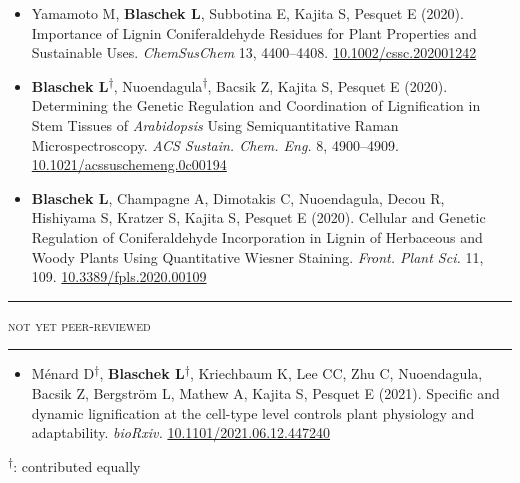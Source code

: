 \documentclass[11pt]{article}
\newcommand*{\xdash}[1][3em]{\rule[0.5ex]{#1}{0.55pt}}
\begin{document}
\vspace{-0.175cm}	
\begin{itemize}[label={},itemindent=-9pt,leftmargin=24pt]
	\itemsep-0.1cm
	\item Yamamoto M, \textbf{Blaschek L}, Subbotina E, Kajita S, Pesquet E (2020). Importance of Lignin Coniferaldehyde Residues for Plant Properties and Sustainable Uses. \textit{ChemSusChem} 13, 4400–4408.
	\href{https://doi.org/10.1002/cssc.202001242}{10.1002/cssc.202001242}
	\item \textbf{Blaschek L}\textsuperscript{$\dagger$}, Nuoendagula\textsuperscript{$\dagger$}, Bacsik Z, Kajita S, Pesquet E (2020). Determining the Genetic Regulation and Coordination of Lignification in Stem Tissues of \textit{Arabidopsis} Using Semiquantitative Raman Microspectroscopy. \textit{ACS Sustain. Chem. Eng.} 8, 4900--4909. \href{https://dx.doi.org/10.1021/acssuschemeng.0c00194}{10.1021/acssuschemeng.0c00194}
	\item \textbf{Blaschek L}, Champagne A, Dimotakis C, Nuoendagula, Decou R, Hishiyama S, Kratzer S, Kajita S, Pesquet E (2020). Cellular and Genetic Regulation of Coniferaldehyde Incorporation in Lignin of Herbaceous and Woody Plants Using Quantitative Wiesner Staining. \textit{Front. Plant Sci.} 11, 109. \href{https://doi.org/10.3389/fpls.2020.00109}{10.3389/fpls.2020.00109}
\end{itemize}

\hspace*{\fill} \xdash[6em] \large{\textsc{not yet peer-reviewed}} \xdash[6em] \hspace*{\fill}\normalsize

\begin{itemize}[label={},itemindent=-9pt,leftmargin=24pt]
	\itemsep-0.1cm
	\item Ménard D\textsuperscript{$\dagger$}, \textbf{Blaschek L}\textsuperscript{$\dagger$}, Kriechbaum K, Lee CC, Zhu C, Nuoendagula, Bacsik Z, Bergström L, Mathew A, Kajita S, Pesquet E (2021). Specific and dynamic lignification at the cell-type level controls plant physiology and adaptability. \textit{bioRxiv.} \href{https://doi.org/10.1101/2021.06.12.447240}{10.1101/2021.06.12.447240}
\end{itemize}

\textsuperscript{$\dagger$}: contributed equally
\vspace{0.5cm}
\end{document}
